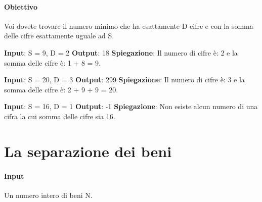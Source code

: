     \paragraph{Obiettivo} Voi dovete trovare il numero minimo che ha esattamente D cifre e con la somma delle cifre esattamente uguale ad S.
    \begin{esempio}
        \newline
        \textbf{Input}: S = 9, D = 2
        \newline
        \textbf{Output}: 18
        \newline
        \textbf{Spiegazione}: Il numero di cifre è: 2 e la somma delle cifre è: 1 + 8 = 9.
    \end{esempio}
    \begin{esempio}
        \newline
        \textbf{Input}: S = 20, D = 3
        \newline
        \textbf{Output}: 299
        \newline
        \textbf{Spiegazione}: Il numero di cifre è: 3 e la somma delle cifre è: 2 + 9 + 9 = 20.
    \end{esempio}
    \begin{esempio}
        \newline
        \textbf{Input}: S = 16, D = 1
        \newline
        \textbf{Output}: -1
        \newline
        \textbf{Spiegazione}: Non esiste alcun numero di una cifra la cui somma delle cifre sia 16.
    \end{esempio}

\newpage
\thispagestyle{chapterInit}
\section*{La separazione dei beni}
    \paragraph{Input} Un numero intero di beni N.
